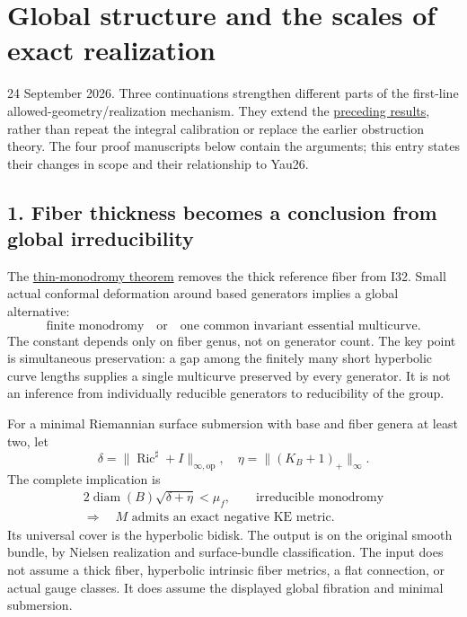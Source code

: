 \documentclass[
  11pt,
]{article}
\author{}
\date{}
\begin{document}
\hypertarget{global-structure-and-the-scales-of-exact-realization}{%
\section{Global structure and the scales of exact
realization}\label{global-structure-and-the-scales-of-exact-realization}}

24 September 2026. Three continuations strengthen different parts of the
first-line allowed-geometry/realization mechanism. They extend the
\href{20260924_global_data_realization.md}{preceding results}, rather
than repeat the integral calibration or replace the earlier obstruction
theory. The four proof manuscripts below contain the arguments; this
entry states their changes in scope and their relationship to Yau26.

\hypertarget{fiber-thickness-becomes-a-conclusion-from-global-irreducibility}{%
\subsection{1. Fiber thickness becomes a conclusion from global
irreducibility}\label{fiber-thickness-becomes-a-conclusion-from-global-irreducibility}}

The \href{20260924_thin_monodromy_alternative.md}{thin-monodromy
theorem} removes the thick reference fiber from I32. Small actual
conformal deformation around based generators implies a global
alternative: \[
 \boxed{\text{finite monodromy}\quad\text{or}\quad
        \text{one common invariant essential multicurve}.}
\] The constant depends only on fiber genus, not on generator count. The
key point is simultaneous preservation: a gap among the finitely many
short hyperbolic curve lengths supplies a single multicurve preserved by
every generator. It is not an inference from individually reducible
generators to reducibility of the group.

For a minimal Riemannian surface submersion with base and fiber genera
at least two, let \[
 \delta=\|\operatorname{Ric}^{\sharp}+I\|_{\infty,\mathrm{op}},
 \quad \eta=\|(K_B+1)_+\|_\infty.
\] The complete implication is \[
 \begin{gathered}
 2\operatorname{diam}(B)\sqrt{\delta+\eta}<\mu_f,
 \qquad\text{irreducible monodromy}\\
 \Longrightarrow\quad
 \boxed{M\text{ admits an exact negative KE metric}.}
 \end{gathered}
\] Its universal cover is the hyperbolic bidisk. The output is on the
original smooth bundle, by Nielsen realization and surface-bundle
classification. The input does not assume a thick fiber, hyperbolic
intrinsic fiber metrics, a flat connection, or actual gauge classes. It
does assume the displayed global fibration and minimal submersion.
\end{document}
